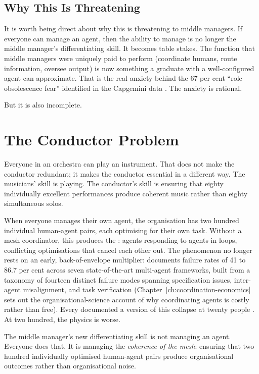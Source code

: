 \subsection{Why This Is Threatening}

It is worth being direct about why this is threatening to middle managers. If everyone can manage an agent, then the ability to manage is no longer the middle manager's differentiating skill. It becomes table stakes. The function that middle managers were uniquely paid to perform (coordinate humans, route information, oversee output) is now something a graduate with a well-configured agent can approximate. That is the real anxiety behind the 67 per cent ``role obsolescence fear'' identified in the Capgemini data \parencite{Capgemini2025}. The anxiety is rational.

But it is also incomplete.

\section{The Conductor Problem}

Everyone in an orchestra can play an instrument. That does not make the conductor redundant; it makes the conductor essential in a different way. The musicians' skill is playing. The conductor's skill is ensuring that eighty individually excellent performances produce coherent music rather than eighty simultaneous solos.

When everyone manages their own agent, the organisation has two hundred individual human-agent pairs, each optimising for their own task. Without a mesh coordinator, this produces the : agents responding to agents in loops, conflicting optimisations that cancel each other out. The phenomenon no longer rests on an early, back-of-envelope multiplier: \textcite{Cemri2025} documents failure rates of 41 to 86.7 per cent across seven state-of-the-art multi-agent frameworks, built from a taxonomy of fourteen distinct failure modes spanning specification issues, inter-agent misalignment, and task verification (Chapter~\ref{ch:coordination-economics} sets out the organisational-science account of why coordinating agents is costly rather than free). Every documented a version of this collapse at twenty people \parencite{Shipper2026}. At two hundred, the physics is worse.

The middle manager's new differentiating skill is not managing an agent. Everyone does that. It is managing the \emph{coherence of the mesh}: ensuring that two hundred individually optimised human-agent pairs produce organisational outcomes rather than organisational noise.

